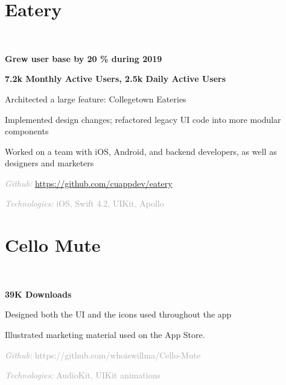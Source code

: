 \documentclass[]{deedy-resume-openfont}
\newcommand{\myurl}[1]{
	\urlstyle{same}\url{#1}
}
\let\sectionold\section
\renewcommand{\section}[1]{
	\sectionold{\textcolor{sectiontitlecolor}{#1}}
}
\begin{document}
\begin{minipage}[t]{0.66\textwidth}
\section{Eatery}
 \\
\begin{tightemize}
\item \textbf{Grew user base by 20 \% during 2019}
\item \textbf{7.2k Monthly Active Users, 2.5k Daily Active Users} 
\item Architected a large feature: Collegetown Eateries
\item Implemented design changes; refactored legacy UI code into more modular components
\item Worked on a team with iOS, Android, and backend developers, as well as designers and marketers
\\
\item \textcolor{darkgray}{\textit{Github:} \myurl{https://github.com/cuappdev/eatery}}  \\
\item \textcolor{darkgray}{\textit{Technologies:} iOS, Swift 4.2, UIKit, Apollo} 
\end{tightemize}

\sectionsep

\section{Cello Mute}
 \\

\begin{tightemize}
\item \textbf{39K Downloads}
\item Designed both the UI and the icons used throughout the app
\item Illustrated marketing material used on the App Store.
\\
\item \textcolor{darkgray}{\textit{Github:} https://github.com/whoiswillma/Cello-Mute}
\item \textcolor{darkgray}{\textit{Technologies:} AudioKit, UIKit animations}
\end{tightemize}


\end{minipage}
\end{document}
